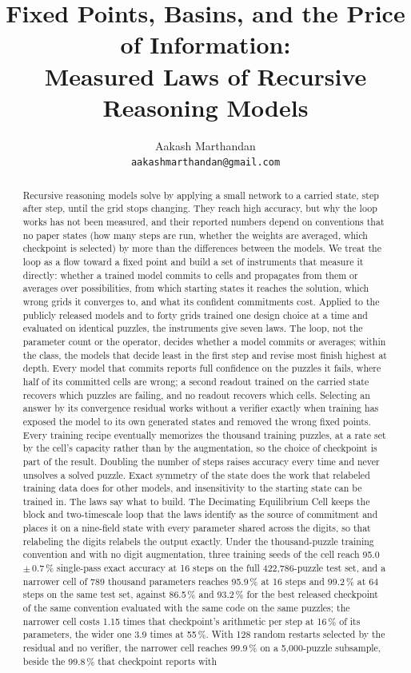 \documentclass[11pt,letterpaper]{article}
\title{Fixed Points, Basins, and the Price of Information:\\ Measured Laws of Recursive Reasoning Models}
\author{Aakash Marthandan\\ \texttt{aakashmarthandan@gmail.com}}
\date{}
\begin{document}
\maketitle

\begin{abstract}
Recursive reasoning models solve \sudext{} by applying a small network to a carried state, step after step, until the grid stops changing. They reach high accuracy, but why the loop works has not been measured, and their reported numbers depend on conventions that no paper states (how many steps are run, whether the weights are averaged, which checkpoint is selected) by more than the differences between the models. We treat the loop as a flow toward a fixed point and build a set of instruments that measure it directly: whether a trained model commits to cells and propagates from them or averages over possibilities, from which starting states it reaches the solution, which wrong grids it converges to, and what its confident commitments cost. Applied to the publicly released models and to forty grids trained one design choice at a time and evaluated on identical puzzles, the instruments give seven laws. The loop, not the parameter count or the operator, decides whether a model commits or averages; within the class, the models that decide least in the first step and revise most finish highest at depth. Every model that commits reports full confidence on the puzzles it fails, where half of its committed cells are wrong; a second readout trained on the carried state recovers which puzzles are failing, and no readout recovers which cells. Selecting an answer by its convergence residual works without a verifier exactly when training has exposed the model to its own generated states and removed the wrong fixed points. Every training recipe eventually memorizes the thousand training puzzles, at a rate set by the cell's capacity rather than by the augmentation, so the choice of checkpoint is part of the result. Doubling the number of steps raises accuracy every time and never unsolves a solved puzzle. Exact symmetry of the state does the work that relabeled training data does for other models, and insensitivity to the starting state can be trained in. The laws say what to build. The Decimating Equilibrium Cell keeps the block and two-timescale loop that the laws identify as the source of commitment and places it on a nine-field state with every parameter shared across the digits, so that relabeling the digits relabels the output exactly. Under the thousand-puzzle training convention and with no digit augmentation, three training seeds of the cell reach 95.0\,$\pm$\,0.7\,\% single-pass exact accuracy at 16 steps on the full 422,786-puzzle test set, and a narrower cell of 789 thousand parameters reaches 95.9\,\% at 16 steps and 99.2\,\% at 64 steps on the same test set, against 86.5\,\% and 93.2\,\% for the best released checkpoint of the same convention evaluated with the same code on the same puzzles; the narrower cell costs 1.15 times that checkpoint's arithmetic per step at 16\,\% of its parameters, the wider one 3.9 times at 55\,\%. With 128 random restarts selected by the residual and no verifier, the narrower cell reaches 99.9\,\% on a 5,000-puzzle subsample, beside the 99.8\,\% that checkpoint reports with 
\end{abstract}
\end{document}
